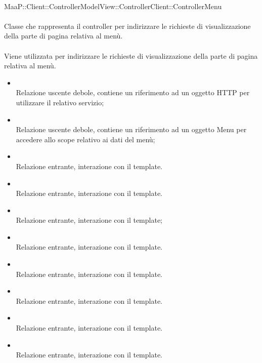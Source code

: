 \\
MaaP::Client::ControllerModelView::ControllerClient::ControllerMenu\\
\\
Classe che rappresenta il controller per indirizzare le richieste di visualizzazione della parte di pagina relativa al menù.\\
\\
Viene utilizzata per indirizzare le richieste di visualizzazione della parte di pagina relativa al menù.\\
\begin{itemize}
\item{}\\
Relazione uscente debole, contiene un riferimento ad un oggetto HTTP per utilizzare il relativo servizio;
\item{}\\
Relazione uscente debole, contiene un riferimento ad un oggetto Menu per accedere allo scope relativo ai dati del menù;
\item{}\\
Relazione entrante, interazione con il template.
\item{}\\
Relazione entrante, interazione con il template.
\item{}\\
Relazione entrante, interazione con il template;
\item{}\\
Relazione entrante, interazione con il template.
\item{}\\
Relazione entrante, interazione con il template.
\item{}\\
Relazione entrante, interazione con il template.
\item{}\\
Relazione entrante, interazione con il template.
\item{}\\
Relazione entrante, interazione con il template.
\end{itemize}

